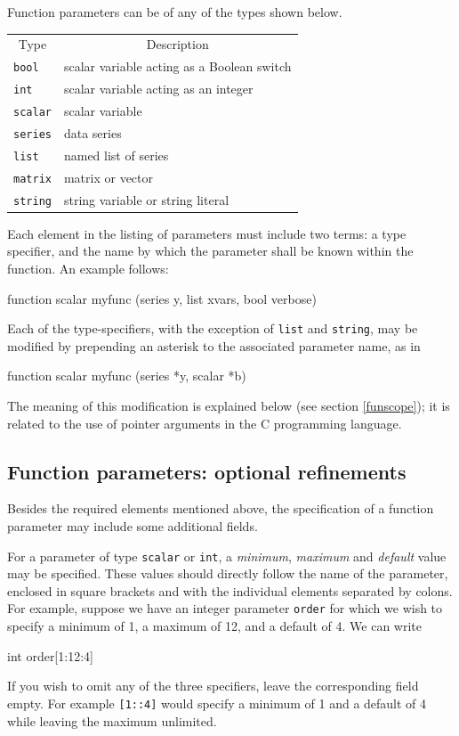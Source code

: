 Function parameters can be of any of the types shown below.

\begin{center}
\begin{tabular}{ll}
\multicolumn{1}{c}{Type} & 
\multicolumn{1}{c}{Description} \\ [4pt]
\texttt{bool}   & scalar variable acting as a Boolean switch \\
\texttt{int}    & scalar variable acting as an integer  \\
\texttt{scalar} & scalar variable \\
\texttt{series} & data series \\
\texttt{list}   & named list of series \\
\texttt{matrix} & matrix or vector \\
\texttt{string} & string variable or string literal 
\end{tabular}
\end{center}

Each element in the listing of parameters must include two terms: a
type specifier, and the name by which the parameter shall be known
within the function.  An example follows:
%    
\begin{code}
function scalar myfunc (series y, list xvars, bool verbose)
\end{code}

Each of the type-specifiers, with the exception of \texttt{list} and
\texttt{string}, may be modified by prepending an asterisk to the
associated parameter name, as in
%    
\begin{code}
function scalar myfunc (series *y, scalar *b)
\end{code}

The meaning of this modification is explained below (see section
\ref{funscope}); it is related to the use of pointer arguments in the
C programming language.

\subsection{Function parameters: optional refinements}

Besides the required elements mentioned above, the specification of a
function parameter may include some additional fields.

For a parameter of type \texttt{scalar} or \texttt{int}, a
\textsl{minimum}, \textsl{maximum} and \textsl{default} value may be
specified.  These values should directly follow the name of the
parameter, enclosed in square brackets and with the individual
elements separated by colons.  For example, suppose we have an integer
parameter \texttt{order} for which we wish to specify a minimum of 1,
a maximum of 12, and a default of 4.  We can write
%    
\begin{code}
int order[1:12:4]
\end{code} 
%
If you wish to omit any of the three specifiers, leave the
corresponding field empty.  For example \texttt{[1::4]} would specify
a minimum of 1 and a default of 4 while leaving the maximum
unlimited.  

